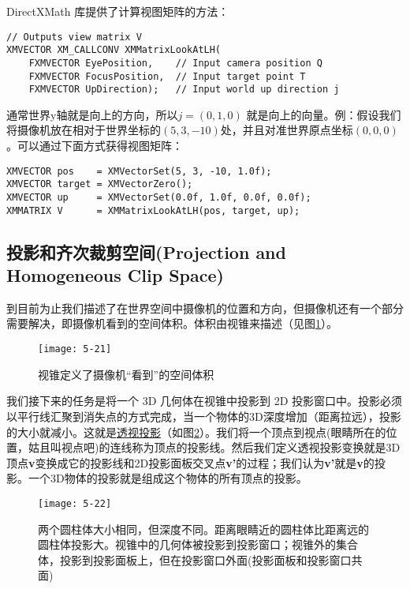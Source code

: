 \begin{flushleft}
DirectXMath 库提供了计算视图矩阵的方法：
\begin{lstlisting}
// Outputs view matrix V
XMVECTOR XM_CALLCONV XMMatrixLookAtLH(
    FXMVECTOR EyePosition,    // Input camera position Q
    FXMVECTOR FocusPosition,  // Input target point T
    FXMVECTOR UpDirection);   // Input world up direction j
\end{lstlisting}
通常世界y轴就是向上的方向，所以$j=(0,1,0)$ 就是向上的向量。例：假设我们将摄像机放在相对于世界坐标的$(5,3,-10)$处，并且对准世界原点坐标$(0,0,0)$。可以通过下面方式获得视图矩阵：\\
\begin{lstlisting}
XMVECTOR pos    = XMVectorSet(5, 3, -10, 1.0f);
XMVECTOR target = XMVectorZero();
XMVECTOR up     = XMVectorSet(0.0f, 1.0f, 0.0f, 0.0f);
XMMATRIX V      = XMMatrixLookAtLH(pos, target, up);
\end{lstlisting}
\end{flushleft}
\subsection{投影和齐次裁剪空间(Projection and Homogeneous Clip Space)}
\begin{flushleft}
到目前为止我们描述了在世界空间中摄像机的位置和方向，但摄像机还有一个部分需要解决，即摄像机看到的空间体积。体积由视锥来描述（见图\ref{fig:5-21}）。
\end{flushleft}
\begin{figure}[t]
    \texttt{[image: 5-21]}
    \centering
    \caption{视锥定义了摄像机“看到”的空间体积}
    \label{fig:5-21}
\end{figure}
\begin{flushleft}
我们接下来的任务是将一个 3D 几何体在视锥中投影到 2D 投影窗口中。投影必须以平行线汇聚到消失点的方式完成，当一个物体的3D深度增加（距离拉远），投影的大小就减小。这就是\href{https://en.wikipedia.org/wiki/Perspective_(graphical)}{\textcolor{linkColor}{透视投影}}（如图\ref{fig:5-22}）。我们将一个顶点到视点(眼睛所在的位置，姑且叫视点吧)的连线称为顶点的投影线。然后我们定义透视投影变换就是3D顶点\textbf{v}变换成它的投影线和2D投影面板交叉点\textbf{v'}的过程；我们认为\textbf{v'}就是\textbf{v}的投影。一个3D物体的投影就是组成这个物体的所有顶点的投影。
\end{flushleft}
\begin{figure}[t]
    \texttt{[image: 5-22]}
    \centering
    \caption{两个圆柱体大小相同，但深度不同。距离眼睛近的圆柱体比距离远的圆柱体投影大。视锥中的几何体被投影到投影窗口；视锥外的集合体，投影到投影面板上，但在投影窗口外面(投影面板和投影窗口共面)}
    \label{fig:5-22}
\end{figure}

